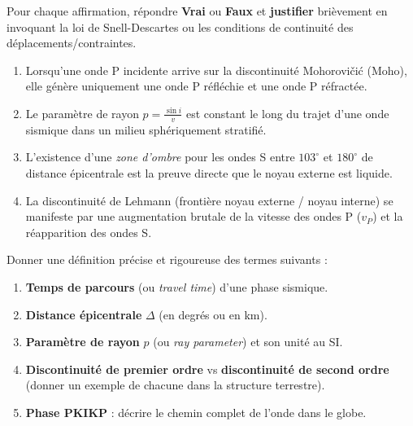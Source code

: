 \documentclass[11pt]{article}
\begin{document}
\begin{exercice}
Pour chaque affirmation, répondre \textbf{Vrai} ou \textbf{Faux} et \textbf{justifier} brièvement en invoquant la loi de Snell-Descartes ou les conditions de continuité des déplacements/contraintes.
\begin{enumerate}
    \item Lorsqu'une onde P incidente arrive sur la discontinuité Mohorovičić (Moho), elle génère uniquement une onde P réfléchie et une onde P réfractée.
    \item Le paramètre de rayon $p = \frac{\sin i}{v}$ est constant le long du trajet d'une onde sismique dans un milieu sphériquement stratifié.
    \item L'existence d'une \emph{zone d'ombre} pour les ondes S entre $103^\circ$ et $180^\circ$ de distance épicentrale est la preuve directe que le noyau externe est liquide.
    \item La discontinuité de Lehmann (frontière noyau externe / noyau interne) se manifeste par une augmentation brutale de la vitesse des ondes P ($v_P$) et la réapparition des ondes S.
\end{enumerate}
\end{exercice}

\begin{exercice}
Donner une définition précise et rigoureuse des termes suivants :
\begin{enumerate}
    \item \textbf{Temps de parcours} (ou \emph{travel time}) d'une phase sismique.
    \item \textbf{Distance épicentrale} $\Delta$ (en degrés ou en km).
    \item \textbf{Paramètre de rayon} $p$ (ou \emph{ray parameter}) et son unité au SI.
    \item \textbf{Discontinuité de premier ordre} vs \textbf{discontinuité de second ordre} (donner un exemple de chacune dans la structure terrestre).
    \item \textbf{Phase PKIKP} : décrire le chemin complet de l'onde dans le globe.
\end{enumerate}
\end{exercice}
\end{document}
